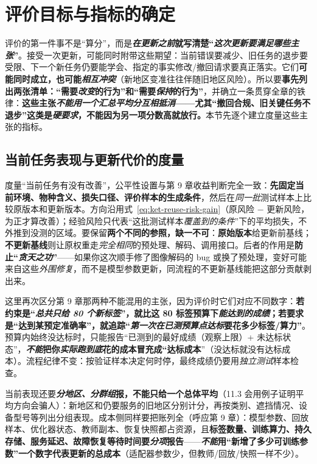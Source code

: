 \section{评价目标与指标的确定}
\label{sec:ket-evolution-evaluation-metrics}

评价的第一件事不是“算分”，而是\textbf{\emph{在更新\emph{之前}}就写清楚“\emph{这次更新要满足哪些\emph{主张}}”}。接受一次更新，可能同时附带这些期望：当前错误要减少、旧任务的退步要受限、下一个新任务仍要能学会、指定的事实修改/撤回请求要真正落实。它们\textbf{可能同时成立，也可能\emph{相互冲突}}（新地区变准往往伴随旧地区风险）。所以要\textbf{事先列出两张清单：“需要\emph{改变}的行为”和“需要\emph{保持}的行为”}，并确立一条贯穿全章的铁律：\textbf{\textbf{这些主张\emph{不能用一个汇总平均分\emph{互相抵消}}——尤其“撤回合规、旧关键任务不退步”这类是\emph{硬要求}，不能因为另一项分数高就放行。}}本节先逐个建立度量这些主张的指标。

\subsection{当前任务表现与更新代价的度量}
\label{sec:ket-evolution-evaluation-current}

度量“当前任务有没有改善”，公平性设置与第 9 章收益判断完全一致：\textbf{先固定当前环境、物种含义、损失口径、评价样本的生成条件}，然后在\emph{同一批}测试样本上比较原版本和更新版本。方向沿用式~\eqref{eq:ket-reuse-risk-gain}（原风险 $-$ 更新风险，为正才算改善）；经验风险只代表“这批测试样本\emph{覆盖到的条件}”下的平均损失，不外推到没测的区域。要保留\textbf{两个不同的参照，缺一不可}：\textbf{原始版本}给更新前基线；\textbf{不更新基线}则让原权重走\emph{完全相同}的预处理、解码、调用接口。后者的作用是\textbf{防止“\emph{贪天之功}”}——如果你这次顺手修了图像解码的 bug 或换了预处理，变好可能来自这些\emph{外围修复}，而不是模型参数更新，同流程的不更新基线能把这部分贡献剥出来。

这里再次区分第 9 章那两种不能混用的主张，因为评价时它们对应不同数字：\textbf{若约束是“\emph{总共只给 80 个新标签}”，就比这 80 标签预算下\emph{能达到的成绩}；若要求是“达到某预定准确率”，就追踪“\emph{第一次在已测预算点达标}要花多少标签/算力”}。预算内始终没达标时，只能报告“已测到的最好成绩（观察上限）+ 未达标状态”，\textbf{\emph{不能}把你\emph{实际跑到底}花的成本冒充成“达标成本}”（没达标就没有达标成本）。流程纪律不变：按验证样本决定何时停，最终成绩仍要用\emph{独立测试}样本检查。

当前表现还要\textbf{\emph{分地区、分群组}报，不能只给一个总体平均}（11.3 会用例子证明平均方向会骗人）：新地区和仍要服务的旧地区分别计分，再按类别、遮挡情况、设备型号等列出分组表现。成本侧同样要把账列全（呼应第 9 章）：模型参数、回放样本、优化器状态、教师副本、恢复快照都占资源，且\textbf{标签数量、训练算力、持久存储、服务延迟、故障恢复等待时间要\emph{分项}报告}——\textbf{\emph{不能}用“新增了多少可训练参数”一个数字代表更新的总成本}（适配器参数少，但教师/回放/快照一样不少）。

